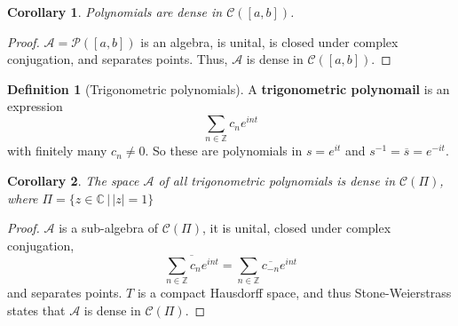 \documentclass[justified]{tufte-book}
\theoremstyle{plain}%
\newtheorem*{cor}{Corollary}
\theoremstyle{definition}
\newtheorem{defn}[thm]{Definition}
\theoremstyle{remark}
\renewcommand{\C}{\mathbb{C}}
\newcommand{\Z}{\mathbb{Z}}
\begin{document}
% 
% 

\begin{cor}
  Polynomials are dense in $\mathcal C([a,b])$.  
\end{cor}
\begin{proof}
  $\mathcal A = \mathcal P([a,b])$ is an algebra, is unital, is closed under complex conjugation, and separates points.  Thus, $\mathcal A$ is dense in $\mathcal C([a,b])$.
\end{proof}

\begin{defn}[Trigonometric polynomials]
  A \textbf{trigonometric polynomail} is an expression \[
      \sum_{ n \in \Z} c_n e^{i n t}
  \] with finitely many $c_n \neq 0$. So these are polynomials in $s = e^{it}$ and $s^{-1} = \overline s = e^{-it}$.
\end{defn}

\begin{cor}
  The space $\mathcal A$ of all trigonometric polynomials is dense in $\mathcal C(\Pi)$, where $\Pi = \{ z \in \C \, | \, |z | = 1 \}$
\end{cor}
\begin{proof}
  $\mathcal A$ is a sub-algebra of $\mathcal C(\Pi)$, it is unital, closed under complex conjugation, \[
      \overline{\sum_{n \in \Z} c_n e^{int}} = \sum_{n \in \Z} \overline{c_{-n}} e^{int}
  \] and separates points.  $T$ is a compact Hausdorff space, and thus Stone-Weierstrass states that $\mathcal{A}$ is dense in $\mathcal C(\Pi)$.  
\end{proof}
\end{document}
